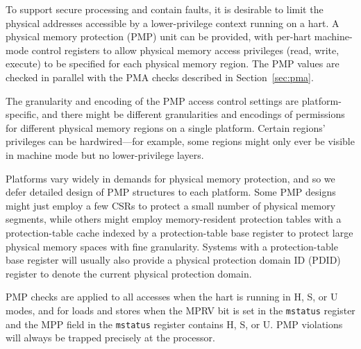 To support secure processing and contain faults, it is desirable to
limit the physical addresses accessible by a lower-privilege context
running on a hart.  A physical memory protection (PMP) unit can be
provided, with per-hart machine-mode control registers to allow
physical memory access privileges (read, write, execute) to be
specified for each physical memory region.  The PMP values are checked
in parallel with the PMA checks described in Section~\ref{sec:pma}.

The granularity and encoding of the PMP access control settings are
platform-specific, and there might be different granularities and
encodings of permissions for different physical memory regions on a
single platform.  Certain regions' privileges can be hardwired---for
example, some regions might only ever be visible in machine mode but
no lower-privilege layers.

\begin{commentary}
Platforms vary widely in demands for physical memory protection, and
so we defer detailed design of PMP structures to each platform.  Some
PMP designs might just employ a few CSRs to protect a small number of
physical memory segments, while others might employ memory-resident
protection tables with a protection-table cache indexed by a
protection-table base register to protect large physical memory spaces
with fine granularity.  Systems with a protection-table base register
will usually also provide a physical protection domain ID (PDID)
register to denote the current physical protection domain.
\end{commentary}

PMP checks are applied to all accesses when the hart is running in H,
S, or U modes, and for loads and stores when the MPRV bit is set in
the {\tt mstatus} register and the MPP field in the {\tt mstatus}
register contains H, S, or U.  PMP violations will always be trapped
precisely at the processor.
